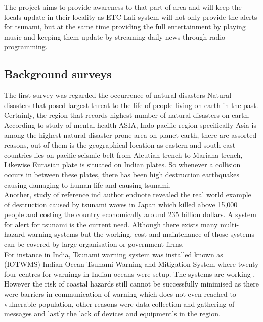  The project aims to provide awareness to that part of area and will keep the locals update in their locality as ETC-Lali system will not only provide the alerts for tsunami, but at the same time providing the full entertainment by playing music and keeping them update by streaming daily news through radio programming.



\subsection{ Background surveys}
The first survey was regarded the occurrence of natural disasters Natural disasters that posed largest threat to the life of people living on earth in the past. Certainly, the region that records highest number of natural disasters on earth,\\

According to study of mental health ASIA, Indo pacific region specifically Asia is among the highest natural disaster prone area on planet earth, there are assorted reasons, out of them is the geographical location as eastern and south east countries lies   on pacific seismic belt  from Aleutian trench to Mariana trench, Likewise Eurasian plate is situated on Indian plates. So whenever a collision occurs in between these plates, there has been high destruction earthquakes causing damaging to human life and causing tsunami.\\


Another, study of reference ind author endnote revealed the real world example of destruction caused by tsunami waves in Japan which killed above 15,000 people and costing the country economically around 235 billion dollars. A system for alert for tsunami is the current need. Although there exists many multi-hazard warning systems but the working, cost and maintenance of those systems can be covered by large organisation or government firms.\\

 For instance in India, Tsunami warning system was installed known as (IOTWMS) Indian Ocean Tsunami Warning and Mitigation System where twenty four centres for warnings in Indian oceans were setup.  The systems are working , However the risk of coastal hazards still cannot be successfully minimised as there were barriers in communication of warning which does not even reached to vulnerable population, other reasons were data collection and gathering of messages and lastly the lack of devices and equipment’s in the region.  

